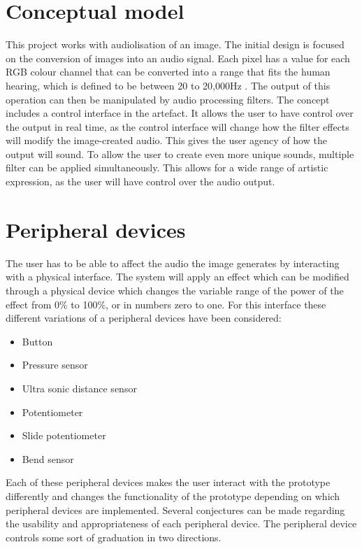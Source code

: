 \section{Conceptual model}\label{sec:conceptualmodel}
This project works with audiolisation of an image. The initial design is focused on the conversion of images into an audio signal. Each pixel has a value for each RGB colour channel that can be converted into a range that fits the human hearing, which is defined to be between 20 to 20,000Hz \cite{Dsp1997}. The output of this operation can then be manipulated by audio processing filters. The concept includes a control interface in the artefact. It allows the user to have control over the output in real time, as the control interface will change how the filter effects will modify the image-created audio. This gives the user agency of how the output will sound. To allow the user to create even more unique sounds, multiple filter can be applied simultaneously. This allows for a wide range of artistic expression, as the user will have control over the audio output.

\section{Peripheral devices}\label{sec:periphealdevices}
The user has to be able to affect the audio the image generates by interacting with a physical interface. The system will apply an effect which can be modified through a physical device which changes the variable range of the power of the effect from 0\% to 100\%, or in numbers zero to one. For this interface these different variations of a peripheral devices have been considered: 

\begin{itemize}
\item Button
\item Pressure sensor
\item Ultra sonic distance sensor
\item Potentiometer
\item Slide potentiometer
\item Bend sensor
\end{itemize}

Each of these peripheral devices makes the user interact with the prototype differently and changes the functionality of the prototype depending on which peripheral devices are implemented. Several conjectures can be made regarding the usability and appropriateness of each peripheral device. The peripheral device controls some sort of graduation in two directions. 


